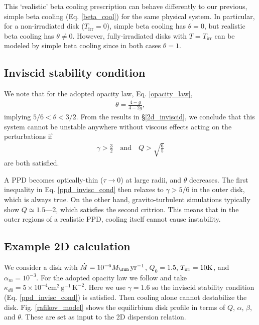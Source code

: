 This `realistic' beta cooling prescription can behave differently to 
our previous, simple beta cooling (Eq. \ref{beta_cool}) for the same
physical system. In particular, for a non-irradiated disk
($T_\mathrm{irr}=0$), simple beta 
cooling has  $\theta=0$, but realistic beta cooling has $\theta\neq
0$. However, fully-irradiated disks with $T=T_\mathrm{irr}$ can be
modeled by simple beta cooling since in both cases $\theta=1$.  



\subsection{Inviscid stability condition} 
We note that for the adopted opacity law, Eq. \ref{opacity_law}, 
\begin{align*}
  \theta = \frac{4-g}{4-2g},
\end{align*}
implying $5/6<\theta<3/2$. 
From the results in \S\ref{2d_inviscid}, we conclude that this
system cannot be unstable anywhere without
viscous effects acting on the perturbations if 
\begin{align}
  \gamma > \frac{3}{2} \quad \text{and} \quad Q > \sqrt{\frac{6}{5}} \label{ppd_invisc_cond}
\end{align} 
are both satisfied.  

A PPD becomes optically-thin ($\tau\to 0$) at
large radii, and $\theta$ decreases. The first inequality in
Eq. \ref{ppd_invisc_cond} then relaxes to $\gamma > 5/6$ in the
outer disk, which is always true. On the other hand, gravito-turbulent
simulations typically show $Q\simeq 1.5$---2, which satisfies the
second critrion. This means that in the
outer regions of a realistic PPD, cooling itself cannot cause instability. 


\subsection{Example 2D calculation}\label{pp2d_example}
We consider a disk with $\dot{M} = 10^{-6}M_\sun\,\yr^{-1}$, $Q_0=1.5$, 
$T_\mathrm{irr}=10\mathrm{K}$, and $\alpha_m=10^{-3}$. For the adopted opacity
law we follow \citeauthor{rafikov15} and take $\kappa_{d0} =
5\times10^{-4}\mathrm{cm}^2\,\mathrm{g}^{-1}\,\mathrm{K}^{-2}$. Here we use
$\gamma=1.6$ so the inviscid stability condition
(Eq. \ref{ppd_invisc_cond}) is satisfied. Then cooling alone cannot
destabilize the disk. Fig. \ref{rafikov_model} shows the equilirbium
disk profile in terms of $Q$, $\alpha$, $\beta$, and $\theta$.  
These are set as input to the 2D dispersion relation.  

